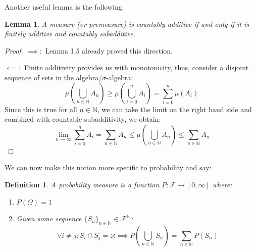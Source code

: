 \documentclass[10pt,letterpaper]{article} %
\newtheorem{lem}{Lemma}[section]
\newtheorem{defn}{Definition}[section]
\begin{document}
Another useful lemma is the following:
\begin{lem}\label{Lemma 1.7}
A measure (or premeasure) is countably additive if and only if it is finitely additive and countably subadditive.
\end{lem}
\begin{proof}
$\implies:$ Lemma 1.5 already proved this direction.

$\impliedby:$ Finite additivity provides us with monotonicity, thus, consider a disjoint sequence of sets in the algebra/$\sigma$-algebra:
\begin{equation*}
\mu\left(\bigcup_{n \in \mathbb{N}}A_n\right) \geqslant \mu\left(\bigcup_{i=0}^nA_i\right) = \sum_{i=0}^n \mu(A_i)
\end{equation*}
Since this is true for all $n \in \mathbb{N}$, we can take the limit on the right hand side and combined with countable subadditivity, we obtain:
\begin{equation*}
\lim_{n \xrightarrow{} \infty}\sum_{i=0}^n A_i = \sum_{n \in \mathbb{N}}A_n \leqslant \mu\left(\bigcup_{n \in \mathbb{N}}A_n\right) \leqslant \sum_{n \in \mathbb{N}}A_n
\end{equation*}
\end{proof}

We can now make this notion more specific to probability and say:
\begin{defn}
A probability measure is a function $P: \mathcal{F} \xrightarrow{} [0, \infty]$ where:
\begin{enumerate}
\item $P(\Omega) = 1$
\item Given some sequence $\{S_n\}_{n \in \mathbb{N}} \in \mathcal{F}^\mathbb{N}$:
\begin{equation*}
\forall i \neq j: S_i \cap S_j = \varnothing \implies P\left(\bigcup_{n \in \mathbb{N}}S_n\right) = \sum_{n \in \mathbb{N}}P(S_n)
\end{equation*}
\end{enumerate}
\end{defn}
\end{document}
